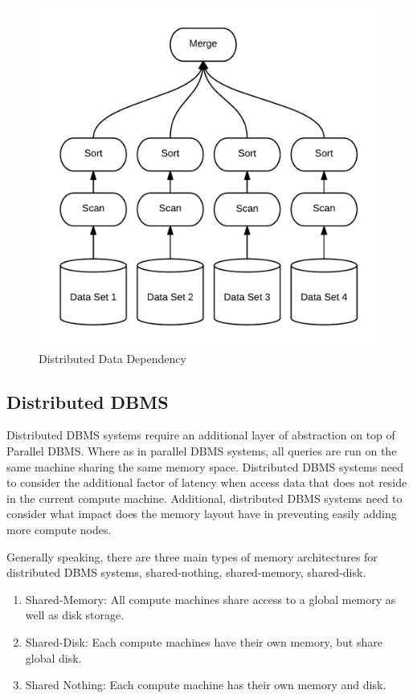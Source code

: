 \documentclass[10pt,twocolumn]{IEEEtran11}
\begin{document}
\begin{figure}[h]
\centering
\includegraphics[scale=0.12]{images/parDBMS.png}
\caption{Distributed Data Dependency}
\label{fig:disDBMS}
\end{figure}

\subsection{Distributed DBMS}

Distributed DBMS systems require an additional layer of abstraction on top of Parallel DBMS.  Where as in parallel DBMS systems, all queries are run on the same machine sharing the same memory space.  Distributed DBMS systems need to consider the additional factor of latency when access data that does not reside in the current compute machine.  Additional, distributed DBMS systems need to consider what impact does the memory layout have in preventing easily adding more compute nodes.  

Generally speaking, there are three main types of memory 
architectures for distributed DBMS systems, shared-nothing, shared-memory, shared-disk.

\begin{enumerate}
\item Shared-Memory: All compute machines share access to a global memory as well as disk storage.  
\item Shared-Disk: Each compute machines have their own memory, but share global disk.
\item Shared Nothing: Each compute machine has their own memory and disk. 
\end{enumerate}
\end{document}
